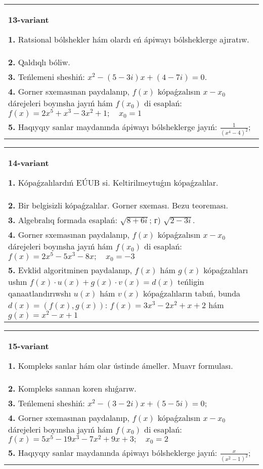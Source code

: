 \documentclass{article}
\begin{document}
\begin{tabular}{m{17cm}}
\textbf{13-variant}
\newline

\textbf{1.} Ratsional bólshekler hám olardı eń ápiwayı bólsheklerge ajıratıw. \\
\textbf{2.} Qaldıqlı bóliw.  \\
\textbf{3.} Teńlemeni sheshiń:  $x^2-(5-3 i) x+(4-7 i)=0$. \\
\textbf{4.} Gorner sxemasınan paydalanıp, $f(x)$ kópaǵzalısın $x-x_0$ dárejeleri boyınsha jayıń hám $f\left(x_0\right)$ di esaplań:  $f(x)=2 x^5+x^3-3 x^2+1 ; \quad x_0=1$ \\
\textbf{5.} Haqıyqıy sanlar maydanında ápiwayı bólsheklerge jayıń:  $\frac{1}{\left(x^4-4\right)^2}$; \\

\end{tabular}
\vspace{1cm}


\begin{tabular}{m{17cm}}
\textbf{14-variant}
\newline

\textbf{1.} Kópaǵzalılardıń EÚUB si. Keltirilmeytuǵın   kópaǵzalılar. \\
\textbf{2.} Bir belgisizli kópaǵzalılar. Gorner sxeması. Bezu teoreması.  \\
\textbf{3.} Algebralıq formada esaplań: $\sqrt{8+6 i}$; г) $\sqrt{2-3 i}$. \\
\textbf{4.} Gorner sxemasınan paydalanıp, $f(x)$ kópaǵzalısın $x-x_0$ dárejeleri boyınsha jayıń hám $f\left(x_0\right)$ di esaplań: $f(x)=2 x^5-5 x^3-8 x ; \quad x_0=-3$ \\
\textbf{5.} Evklid algoritminen paydalanıp, $f(x)$ hám $g(x)$ kópaǵzalıları ushın $f(x) \cdot u(x)+g(x) \cdot v(x)=d(x)$ teńligin qanaatlandırıwshı $u(x)$ hám $v(x)$ kópaǵzalıların tabıń, bunda $d(x)=(f(x), g(x))$:  $f(x)=3 x^3-2 x^2+x+2$ hám $g(x)=x^2-x+1$ \\

\end{tabular}
\vspace{1cm}


\begin{tabular}{m{17cm}}
\textbf{15-variant}
\newline

\textbf{1.} Kompleks sanlar hám olar ústinde ámeller. Muavr formulası.  \\
\textbf{2.} Kompleks sannan koren shıǵarıw. \\
\textbf{3.} Teńlemeni sheshiń:  $x^2-(3-2 i) x+(5-5 i)=0$; \\
\textbf{4.} Gorner sxemasınan paydalanıp, $f(x)$ kópaǵzalısın $x-x_0$ dárejeleri boyınsha jayıń hám $f\left(x_0\right)$ di esaplań: $f(x)=5 x^5-19 x^3-7 x^2+9 x+3 ; \quad x_0=2$ \\
\textbf{5.} Haqıyqıy sanlar maydanında ápiwayı bólsheklerge jayıń:  $\frac{x}{\left(x^2-1\right)^2}$; \\

\end{tabular}
\vspace{1cm}
\end{document}
